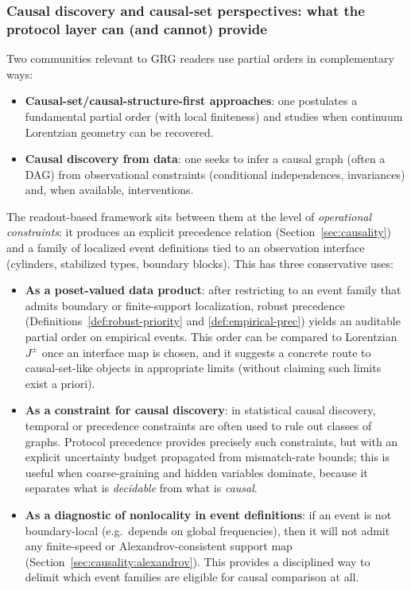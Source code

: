 \subsubsection{Causal discovery and causal-set perspectives: what the protocol layer can (and cannot) provide}\label{sec:discussion:causal-discovery}

Two communities relevant to GRG readers use partial orders in complementary ways:
\begin{itemize}[leftmargin=*,itemsep=2pt]
  \item \textbf{Causal-set/causal-structure-first approaches}: one postulates a fundamental partial order (with local finiteness) and studies when continuum Lorentzian geometry can be recovered.\cite{Bombelli1987,Sorkin2003,Henson2006}
  \item \textbf{Causal discovery from data}: one seeks to infer a causal graph (often a DAG) from observational constraints (conditional independences, invariances) and, when available, interventions.\cite{Pearl2009Causality,SpirtesGlymourScheines2001CPS,PetersJanzingSchoelkopf2017}
\end{itemize}

The readout-based framework sits between them at the level of \emph{operational constraints}: it produces an explicit precedence relation (Section~\ref{sec:causality}) and a family of localized event definitions tied to an observation interface (cylinders, stabilized types, boundary blocks). This has three conservative uses:
\begin{itemize}[leftmargin=*,itemsep=2pt]
  \item \textbf{As a poset-valued data product}: after restricting to an event family that admits boundary or finite-support localization, robust precedence (Definitions~\ref{def:robust-priority} and \ref{def:empirical-prec}) yields an auditable partial order on empirical events. This order can be compared to Lorentzian \(J^\pm\) once an interface map is chosen, and it suggests a concrete route to causal-set-like objects in appropriate limits (without claiming such limits exist a priori).
  \item \textbf{As a constraint for causal discovery}: in statistical causal discovery, temporal or precedence constraints are often used to rule out classes of graphs. Protocol precedence provides precisely such constraints, but with an explicit uncertainty budget propagated from mismatch-rate bounds; this is useful when coarse-graining and hidden variables dominate, because it separates what is \emph{decidable} from what is \emph{causal}.
  \item \textbf{As a diagnostic of nonlocality in event definitions}: if an event is not boundary-local (e.g.\ depends on global frequencies), then it will not admit any finite-speed or Alexandrov-consistent support map (Section~\ref{sec:causality:alexandrov}). This provides a disciplined way to delimit which event families are eligible for causal comparison at all.
\end{itemize}


